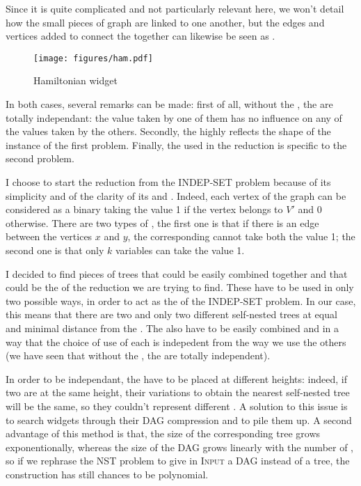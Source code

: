 Since it is quite complicated and not particularly relevant here, we
won't detail how the small pieces of graph are linked to one another,
but the edges and vertices added to connect the \widgets together can
likewise be seen as \constraints.

\begin{figure}
  \centering
  \texttt{[image: figures/ham.pdf]}

  \caption{Hamiltonian widget}
  \label{fig:hamilton}
\end{figure}

In both cases, several remarks can be made: first of all, without the
\constraints, the \widgets are totally independant: the value taken by
one of them has no influence on any of the values taken by the
others. Secondly, the \constraints highly reflects the shape of
the instance of the first problem. Finally, the \widget used in the
reduction is specific to the second problem.

I choose to start the reduction from the INDEP-SET problem because
of its simplicity and of the clarity of its \constraints and
\variables. Indeed, each vertex of the graph can be considered as
a binary \variable taking the value 1 if the vertex belongs to $V'$
and 0 otherwise. There are two types of \constraints, the first one is that
if there is an edge between the vertices $x$ and $y$, the
corresponding \variables cannot take both the value 1; the second one is
that only $k$ variables can take the value 1.

I decided to find pieces of trees that could be easily combined
together and that could be the \widgets of the reduction we are trying
to find. These \widgets have to be used in only two possible ways, in
order to act as the \variables of the INDEP-SET problem. In our case,
this means that there are two and only two different self-nested trees
at equal and minimal distance from the \widget. The \widgets also have
to be easily combined and in a way that the choice of use of each
\widget is indepedent from the way we use the others (we have seen
that without the \constraints, the \widgets are totally independent). 

In order to be independant, the \widgets have to be placed at
different heights: indeed, if two \widgets are at the same height,
their variations to obtain the nearest self-nested tree will be the
same, so they couldn't represent different \variables. A solution to
this issue is to search widgets through their DAG compression and to
pile them up. A second advantage of this method is that, the size of
the corresponding tree grows exponentionally, whereas the size of the
DAG grows linearly with the number of \widgets, so if we rephrase the
NST problem to give in \textsc{Input} a DAG instead of a tree, the
construction has still chances to be polynomial.

